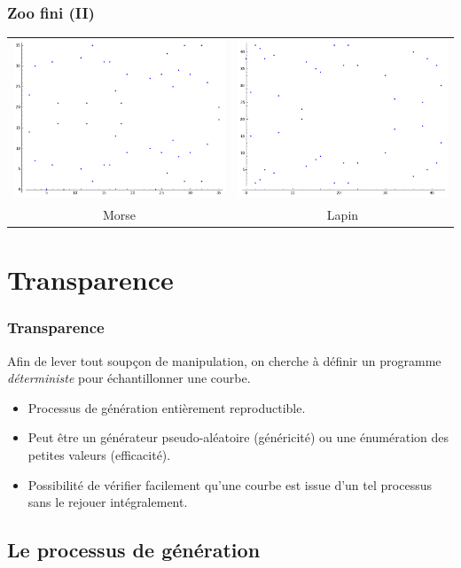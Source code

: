 \documentclass[francais]{beamer}
\begin{document}
\begin{frame}\frametitle{Zoo fini (II)}
\begin{center}
\begin{tabular}{cc}
\includegraphics[width=.45\hsize]{walrus} & \includegraphics[width=.45\hsize]{bunny} \\
Morse & Lapin \\
\end{tabular}
\end{center}
\end{frame}

\section{Transparence}

\begin{frame}\frametitle{Transparence}
Afin de lever tout soupçon de manipulation, on cherche à définir
un programme \emph{déterministe} pour échantillonner une courbe.
\begin{itemize}
\item Processus de génération entièrement reproductible.
\item Peut être un générateur pseudo-aléatoire (généricité)
ou une énumération des petites valeurs (efficacité).
\item Possibilité de vérifier facilement qu'une courbe est issue
d'un tel processus sans le rejouer intégralement.
\end{itemize}
\end{frame}

\subsection{Le processus de génération}
\end{document}
